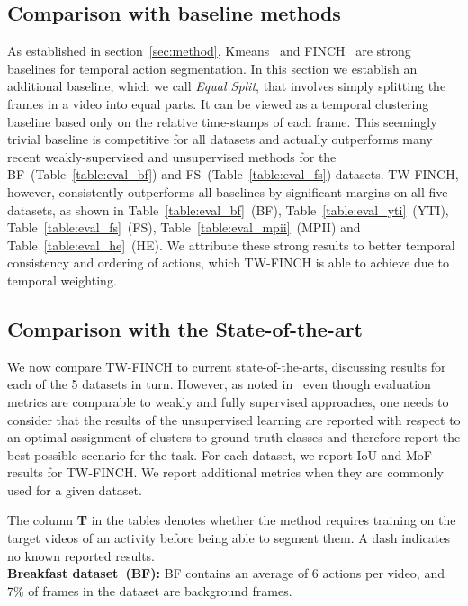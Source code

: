 \documentclass[10pt,twocolumn,letterpaper]{article}
\begin{document}
\subsection{Comparison with baseline methods}
As established in section~\ref{sec:method}, Kmeans~\cite{kmeans} and FINCH~\cite{finch} are strong baselines for temporal action segmentation.
In this section we establish an additional baseline, which we call \textit{Equal Split}, that involves simply splitting the frames in a video into  equal parts.
It can be viewed as a temporal clustering baseline based only on the relative time-stamps of each frame.
This seemingly trivial baseline is competitive for all datasets and actually outperforms many recent weakly-supervised and unsupervised methods for the BF~(Table~\ref{table:eval_bf}) and FS~(Table~\ref{table:eval_fs}) datasets.
TW-FINCH, however, consistently outperforms all baselines by significant margins on all five datasets, as shown in Table~\ref{table:eval_bf}~(BF), Table~\ref{table:eval_yti}~(YTI), Table~\ref{table:eval_fs}~(FS), Table~\ref{table:eval_mpii}~(MPII) and Table~\ref{table:eval_he}~(HE).
We attribute these strong results to better temporal consistency and ordering of actions, which TW-FINCH is able to achieve due to temporal weighting.

\subsection{Comparison with the State-of-the-art} We now compare TW-FINCH
to current state-of-the-arts, discussing results for each of the 5 datasets in turn. However, as noted in~\cite{ute_paper} even though evaluation metrics are comparable to weakly and fully
supervised approaches, one needs to consider that the results of the unsupervised learning are reported with respect
to an optimal assignment of clusters to ground-truth classes
and therefore report the best possible scenario for the task.
For each dataset, we report IoU and MoF results for TW-FINCH. We report additional metrics when they are commonly used for a given dataset.

The column \textbf{T} in the tables denotes whether the method requires training on the target videos of an activity before being able to segment them. A dash indicates no known reported results.\\



\noindent\textbf{Breakfast dataset~(BF):} BF contains an average of 6 actions per video, and 7\% of frames in the dataset are background frames.
\end{document}
